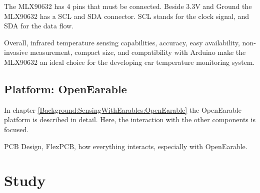 The MLX90632 has 4 pins that must be connected. Beside 3.3V and Ground the MLX90632 has a SCL and SDA connector. SCL stands for the clock signal, and SDA for the data flow.

Overall, infrared temperature sensing capabilities, accuracy, easy availability, non-invasive measurement, compact size, and compatibility with Arduino make the MLX90632 an ideal choice for the developing ear temperature monitoring system.

\subsection{Platform: OpenEarable}
\label{ch:Design:Prototype:OpenEarable}

In chapter \ref{Background:SensingWithEarables:OpenEarable} the OpenEarable platform is described in detail. 
Here, the interaction with the other components is focused.



PCB Design, FlexPCB, how everything interacts, especially with OpenEarable.

\section{Study}
\label{ch:Design:Study}